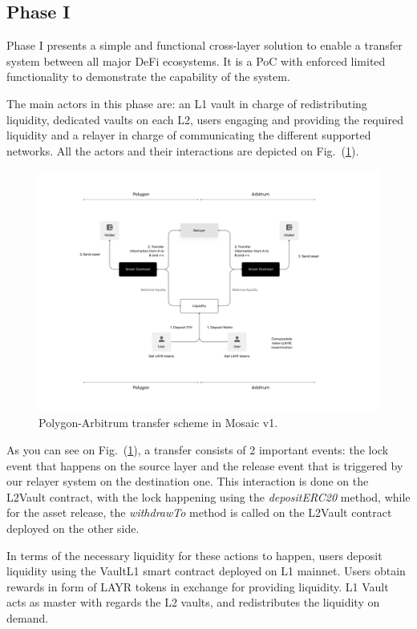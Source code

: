 \subsection{Phase I\label{sec:phaseI}}

Phase I presents a simple and functional cross-layer solution to enable a transfer system between all major DeFi ecosystems. It is a PoC with enforced limited functionality to demonstrate the capability of the system.

The main actors in this phase are: an L1 vault in charge of redistributing liquidity, dedicated vaults on each L2, users engaging and providing the required liquidity and a relayer in charge of communicating the different supported networks. All the actors and their interactions are depicted on Fig.~(\ref{fig:v1_mosaic}).

\begin{figure}[h]
    \centering
    \includegraphics[width=1\textwidth]{images/mosaic/v1.png}
    \caption{Polygon-Arbitrum transfer scheme in Mosaic v1.}
    \label{fig:v1_mosaic}
\end{figure}

As you can see on Fig.~(\ref{fig:v1_mosaic}), a transfer consists of 2 important events: the lock event that happens on the source layer and the release event that is triggered by our relayer system on the destination one. This interaction is done on the L2Vault contract, with the lock happening using the \textit{depositERC20} method, while for the asset release, the \textit{withdrawTo} method is called on the L2Vault contract deployed on the other side.

In terms of the necessary liquidity for these actions to happen, users deposit liquidity using the VaultL1 smart contract deployed on L1 mainnet. Users obtain rewards in form of LAYR tokens in exchange for providing liquidity. L1 Vault acts as master with regards the L2 vaults, and redistributes the liquidity on demand. 

